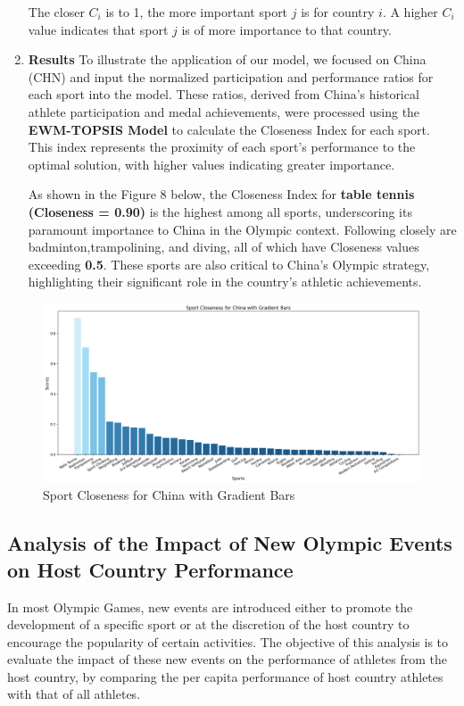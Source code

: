 \documentclass[12pt]{article}  %
\begin{document}
\begin{enumerate}[\textbullet]
    The closer $C_i$ is to 1, the more important sport $j$ is for country $i$. A higher $C_i$ value indicates that sport $j$ is of more importance to that country.

    \item \textbf{Results}
    To illustrate the application of our model, we focused on China (CHN) and input the normalized participation and performance ratios for each sport into the model. These ratios, derived from China’s historical athlete participation and medal achievements, were processed using the \textbf{EWM-TOPSIS Model} to calculate the Closeness Index for each sport. This index represents the proximity of each sport’s performance to the optimal solution, with higher values indicating greater importance.

    As shown in the Figure 8 below, the Closeness Index for \textbf{table tennis (Closeness = 0.90)} is the highest among all sports, underscoring its paramount importance to China in the Olympic context. Following closely are badminton,trampolining, and diving, all of which have Closeness values exceeding \textbf{0.5}. These sports are also critical to China’s Olympic strategy, highlighting their significant role in the country’s athletic achievements.
\end{enumerate}

\begin{figure}[H]
    \centering
    \includegraphics[width=0.75\linewidth]{Sport-Score-CHN.png}
    \caption{Sport Closeness for China with Gradient Bars}
    \label{fig:enter-label}
\end{figure}

\subsection{Analysis of the Impact of New Olympic Events on Host Country Performance}

In most Olympic Games, new events are introduced either to promote the development of a specific sport or at the discretion of the host country to encourage the popularity of certain activities. The objective of this analysis is to evaluate the impact of these new events on the performance of athletes from the host country, by comparing the per capita performance of host country athletes with that of all athletes.
\end{document}
